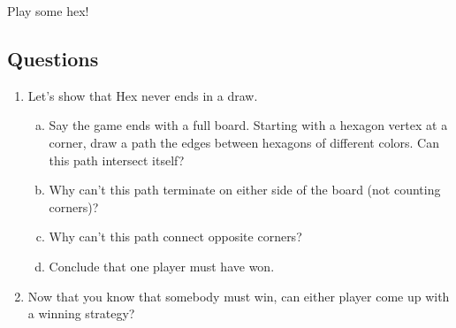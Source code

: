\documentclass[12pt]{article}
\begin{document}
\noindent Play some hex!


\subsection*{Questions}
\begin{enumerate}
	\item Let's show that Hex never ends in a draw.
	\begin{enumerate}[(a)]
		\item Say the game ends with a full board. Starting with a hexagon vertex at a corner, draw a path the edges between hexagons of different colors. Can this path intersect itself?
		\vspace{3cm}
		\item Why can't this path terminate on either side of the board (not counting corners)?
		\vspace{4cm}
		\item Why can't this path connect opposite corners?
		\vspace{4cm}
		\item Conclude that one player must have won.
		\vspace{4cm}
	\end{enumerate}

	\item Now that you know that somebody must win, can either player come up with a winning strategy?
\end{enumerate}





\end{document}
